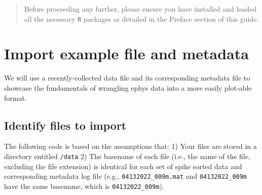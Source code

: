 \documentclass[
]{book}
\begin{document}
\begin{quote}
Before proceeding any further, please ensure you have installed and loaded all
the necessary \texttt{R} packages as detailed in the Preface section of this guide.
\end{quote}

\hypertarget{import-example-file-and-metadata}{%
\section{Import example file and metadata}\label{import-example-file-and-metadata}}

We will use a recently-collected data file and its corresponding metadata file
to showcase the fundamentals of wrangling ephys data into a more easily
plot-able format.

\hypertarget{identify-files-to-import}{%
\subsection{Identify files to import}\label{identify-files-to-import}}

The following code is based on the assumptions that: 1) Your files are stored in
a directory entitled \texttt{/data} 2) The basename of each file (i.e., the name of the
file, excluding the file extension) is identical for each set of spike sorted
data and corresponding metadata log file (e.g., \texttt{04132022\_009m.mat} and
\texttt{04132022\_009m} have the same basename, which is \texttt{04132022\_009m}).
\end{document}

